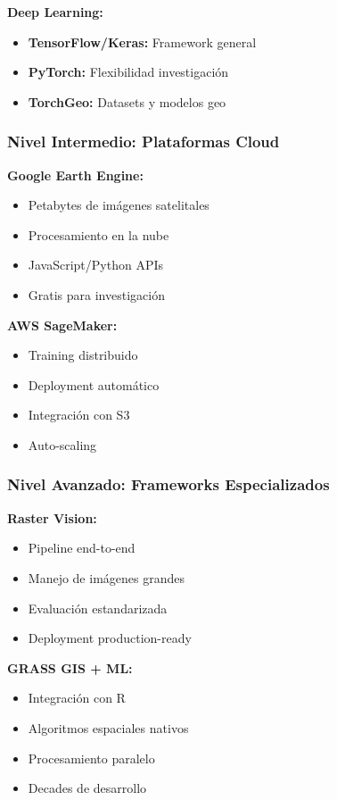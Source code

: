 \documentclass[12pt,a4paper]{article}
\begin{document}
\textbf{Deep Learning:}
\begin{itemize}
    \item \textbf{TensorFlow/Keras:} Framework general
    \item \textbf{PyTorch:} Flexibilidad investigación
    \item \textbf{TorchGeo:} Datasets y modelos geo
\end{itemize}

\subsubsection{Nivel Intermedio: Plataformas Cloud}

\textbf{Google Earth Engine:}
\begin{itemize}
    \item Petabytes de imágenes satelitales
    \item Procesamiento en la nube
    \item JavaScript/Python APIs
    \item Gratis para investigación
\end{itemize}

\textbf{AWS SageMaker:}
\begin{itemize}
    \item Training distribuido
    \item Deployment automático
    \item Integración con S3
    \item Auto-scaling
\end{itemize}

\subsubsection{Nivel Avanzado: Frameworks Especializados}

\textbf{Raster Vision:}
\begin{itemize}
    \item Pipeline end-to-end
    \item Manejo de imágenes grandes
    \item Evaluación estandarizada
    \item Deployment production-ready
\end{itemize}

\textbf{GRASS GIS + ML:}
\begin{itemize}
    \item Integración con R
    \item Algoritmos espaciales nativos
    \item Procesamiento paralelo
    \item Decades de desarrollo
\end{itemize}
\end{document}

